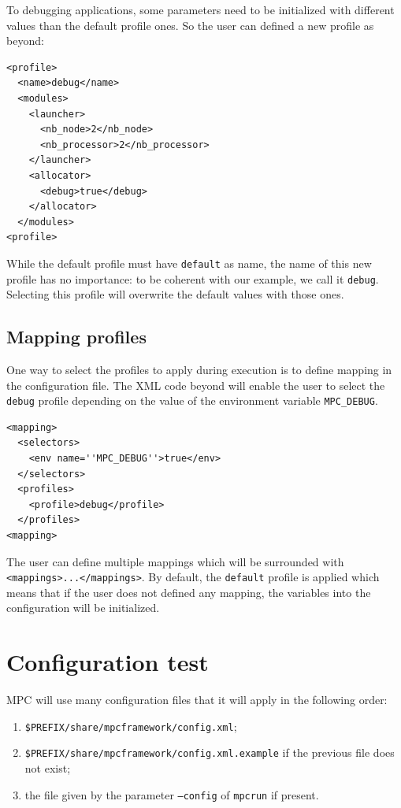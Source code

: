 \documentclass{article}
\begin{document}
To debugging applications, some parameters need to be initialized with different values than the default profile ones. So the user can defined a new profile as beyond:

\lstset{language=XML}
\begin{lstlisting}[title=Example of \texttt{debug} profile]
<profile>
  <name>debug</name>
  <modules>
    <launcher>
      <nb_node>2</nb_node>
      <nb_processor>2</nb_processor>
    </launcher>
    <allocator>
      <debug>true</debug>
    </allocator>
  </modules>
<profile>
\end{lstlisting}

\noindent While the default profile must have \texttt{default} as name, the name of this new profile has no importance: to be coherent with our example, we call it \texttt{debug}. Selecting this profile will overwrite the default values with those ones.

\subsection{Mapping profiles}

One way to select the profiles to apply during execution is to define mapping in the configuration file. The XML code beyond will enable the user to select the \texttt{debug} profile depending on the value of the environment variable \texttt{MPC\_DEBUG}.

\lstset{language=XML}
\begin{lstlisting}[title=Example of mapping to apply \texttt{debug} profile]
<mapping>
  <selectors>
    <env name=''MPC_DEBUG''>true</env>
  </selectors>
  <profiles>
    <profile>debug</profile>
  </profiles>
<mapping>
\end{lstlisting}

\noindent The user can define multiple mappings which will be surrounded with \texttt{<mappings>...</mappings>}. By default, the \texttt{default} profile is applied which means that if the user does not defined any mapping, the variables into the configuration will be initialized.

\section{Configuration test}

MPC will use many configuration files that it will apply in the following order:
\begin{enumerate}
\item \texttt{\$PREFIX/share/mpcframework/config.xml};
\item \texttt{\$PREFIX/share/mpcframework/config.xml.example} if the previous file does not exist;
\item the file given by the parameter \texttt{--config} of \texttt{mpcrun} if present.
\end{enumerate}
\end{document}
